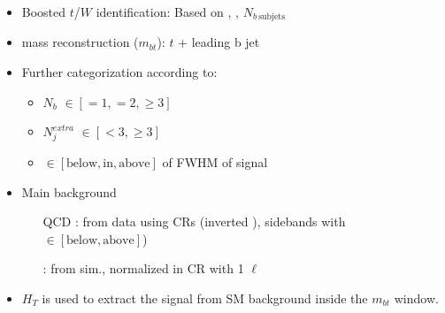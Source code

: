 {  \vspace{-0.2cm}

  \begin{itemize}
    \small
  \item Boosted $t$/$W$ identification: Based on \mSD[],
    , $N_{b \ \text{subjets}}$
  \item \PHpm mass reconstruction ($m_{bt}$): $t$ + leading \pT b jet
  \item Further categorization according to:
    \begin{itemize}
      \setlength{\itemindent}{1mm}
      \footnotesize
    \item $N_{b}$ $\in [=1, =2, \geq 3]$
    \item $N_{j}^{extra}$ $\in [< 3, \geq 3]$
    \item \mHpmReco $\in [\text{below}, \text{in}, \text{above}]$ of FWHM of signal
    \end{itemize}
  \end{itemize}


  \twoColumns
      {
        \begin{itemize}
          \small
        \item Main background
          \begin{itemize}
            \footnotesize
          \item[QCD]: from data using CRs (inverted
            ), sidebands with \mHpmReco
            $\in [\text{below},\text{above}]$)
          \item[\ttbar]: from sim., normalized in CR with 1
            $\ell$
          \end{itemize}
        \end{itemize}
      }
      {
        
        \vspace{-2.7cm}
      }

      \vspace{-0.1cm}
      
      \begin{itemize}
        \small
        \item $H_{T}$ is used to extract the signal from SM background inside the $m_{bt}$ window.
      \end{itemize}
}

